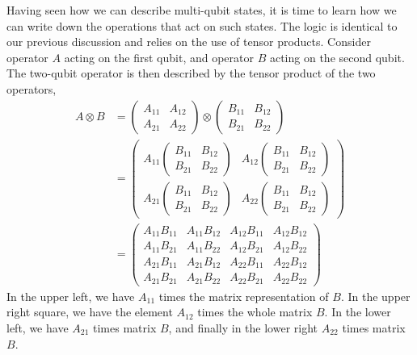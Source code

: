Having seen how we can describe multi-qubit states, it is time to learn how we can write down the operations that act on such states.
The logic is identical to our previous discussion and relies on the use of tensor products.
Consider operator $A$ acting on the first qubit, and operator $B$ acting on the second qubit.
The two-qubit operator is then described by the tensor product of the two operators,
\begin{equation}
\begin{aligned}
A \otimes B &=\left(\begin{array}{ll}
A_{11} & A_{12} \\
A_{21} & A_{22}
\end{array}\right) \otimes\left(\begin{array}{ll}
B_{11} & B_{12} \\
B_{21} & B_{22}
\end{array}\right) \\
&=\left(\begin{array}{lll}
A_{11}\left(\begin{array}{ll}
B_{11} & B_{12} \\
B_{21} & B_{22}
\end{array}\right) & A_{12}\left(\begin{array}{ll}
B_{11} & B_{12} \\
B_{21} & B_{22}
\end{array}\right) \\
A_{21}\left(\begin{array}{ll}
B_{11} & B_{12} \\
B_{21} & B_{22}
\end{array}\right) & A_{22}\left(\begin{array}{ll}
B_{11} & B_{12} \\
B_{21} & B_{22}
\end{array}\right)
\end{array}\right) \\
&=\left(\begin{array}{llll}
A_{11} B_{11} & A_{11} B_{12} & A_{12} B_{11} & A_{12} B_{12} \\
A_{11} B_{21} & A_{11} B_{22} & A_{12} B_{21} & A_{12} B_{22} \\
A_{21} B_{11} & A_{21} B_{12} & A_{22} B_{11} & A_{22} B_{12} \\
A_{21} B_{21} & A_{21} B_{22} & A_{22} B_{21} & A_{22} B_{22}
\end{array}\right)
\end{aligned}
\end{equation}
In the upper left, we have $A_{11}$ times the matrix representation of $B$. In the upper right square, we have the element $A_{12}$ times the whole matrix $B$. In the lower left, we have  $A_{21}$ times matrix $B$, and finally in the lower right $A_{22}$ times matrix $B$.

